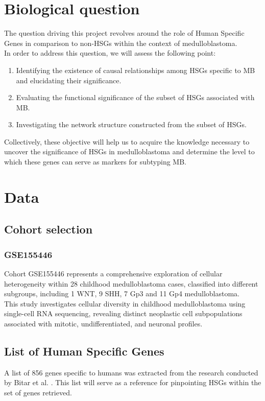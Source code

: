 \documentclass[10pt]{SelfArx} %
\begin{document}
\section{Biological question}\label{sec:biological_question}
The question driving this project revolves around the role of Human Specific Genes in comparison to non-HSGs within the context of medulloblastoma. \\
In order to address this question, we will assess the following point: 
\begin{enumerate}
    \item Identifying the existence of causal relationships among HSGs specific to MB and elucidating their significance. 
    \item Evaluating the functional significance of the subset of HSGs associated with MB.
    \item Investigating the network structure constructed from the subset of HSGs. 
\end{enumerate}
Collectively, these objective will help us to acquire the knowledge necessary to uncover the significance of HSGs in medulloblastoma and determine the level to which these genes can serve as markers for subtyping MB.

\section{Data}\label{sec:data}

\subsection{Cohort selection}\label{sec:cohort_selection}

\subsubsection{GSE155446}\label{sec:GSE155446}
Cohort GSE155446 \cite{riemondy2022neoplastic} represents a comprehensive exploration of cellular heterogeneity within 28 childhood medulloblastoma cases, classified into different subgroups, including 1 WNT, 9 SHH, 7 Gp3 and 11 Gp4 medulloblastoma. \\
This study investigates cellular diversity in childhood medulloblastoma using single-cell RNA sequencing, revealing distinct neoplastic cell subpopulations associated with mitotic, undifferentiated, and neuronal profiles. 

\subsection{List of Human Specific Genes}\label{sec:list_genes}
A list of 856 genes specific to humans was extracted from the research conducted by Bitar et al. \cite{bitar2019genes}. This list will serve as a reference for pinpointing HSGs within the set of genes retrieved. \\
\end{document}
